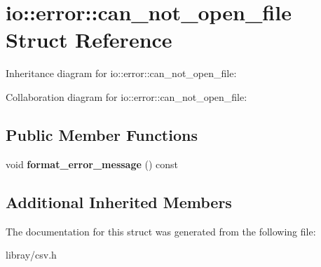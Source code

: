\hypertarget{structio_1_1error_1_1can__not__open__file}{}\section{io\+:\+:error\+:\+:can\+\_\+not\+\_\+open\+\_\+file Struct Reference}
\label{structio_1_1error_1_1can__not__open__file}


Inheritance diagram for io\+:\+:error\+:\+:can\+\_\+not\+\_\+open\+\_\+file\+:


Collaboration diagram for io\+:\+:error\+:\+:can\+\_\+not\+\_\+open\+\_\+file\+:
\subsection*{Public Member Functions}
\begin{DoxyCompactItemize}
\item 
\mbox{\label{structio_1_1error_1_1can__not__open__file_a0249122edaf123e9fa4baabe8128806c}} 
void {\bfseries format\+\_\+error\+\_\+message} () const
\end{DoxyCompactItemize}
\subsection*{Additional Inherited Members}


The documentation for this struct was generated from the following file\+:\begin{DoxyCompactItemize}
\item 
libray/csv.\+h\end{DoxyCompactItemize}
